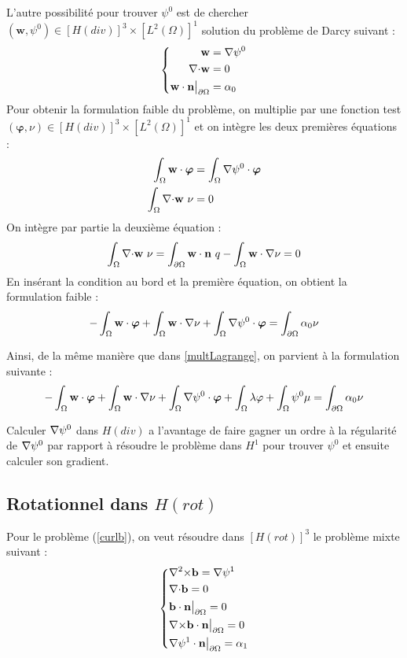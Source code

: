 L'autre possibilité pour trouver $\psi^0$ est de chercher $(\mathbf{w},\psi^0)\in [H(div)]^3\times [L^2(\Omega)]^1$ solution du problème de Darcy suivant :
\begin{equation}\label{pbpsidiv}
\left\{\begin{aligned}
\mathbf{w} &= {\nabla} \psi^0\\
{\nabla\cdot} \mathbf{w} &= 0\\
\mathbf{w}\cdot \mathbf{n}{\big\rvert_{\partial\Omega}} &= \alpha_0
\end{aligned}\right.
\end{equation}
Pour obtenir la formulation faible du problème, on multiplie par une fonction test $(\bm{\varphi},\nu)\in [H(div)]^3\times [L^2(\Omega)]^1$ et on intègre les deux premières équations :
\begin{align*}
\int_\Omega \mathbf{w}\cdot\bm{\varphi} &= \int_\Omega {\nabla}\psi^0\cdot\bm{\varphi}\\
\int_\Omega {\nabla\cdot} \mathbf{w}\ \nu &= 0
\end{align*}
On intègre par partie la deuxième équation :
\[ \int_\Omega {\nabla\cdot} \mathbf{w}\ \nu = \int_{\partial\Omega} \mathbf{w}\cdot \mathbf{n}\ q - \int_\Omega \mathbf{w}\cdot{\nabla}\nu = 0  \]
En insérant la condition au bord et la première équation, on obtient la formulation faible :
\[ -\int_\Omega \mathbf{w}\cdot\bm{\varphi} + \int_\Omega \mathbf{w}\cdot{\nabla}\nu + \int_\Omega {\nabla}\psi^0\cdot\bm{\varphi}  = \int_{\partial\Omega} \alpha_0\nu \]

 Ainsi, de la même manière que dans \ref{multLagrange}, on parvient à la formulation suivante :
\begin{equation}\label{fvpsidiv}
-\int_\Omega \mathbf{w}\cdot\bm{\varphi} + \int_\Omega \mathbf{w}\cdot{\nabla}\nu + \int_\Omega {\nabla}\psi^0\cdot\bm{\varphi} + \int_\Omega \lambda\varphi + \int_\Omega \psi^0\mu = \int_{\partial\Omega} \alpha_0\nu
\end{equation}

Calculer ${\nabla}\psi^0$ dans $H(div)$ a l'avantage de faire gagner un ordre à la régularité de ${\nabla}\psi^0$ par rapport à résoudre le problème dans $H^1$ pour trouver $\psi^0$ et ensuite calculer son gradient.\\

\subsection{Rotationnel dans $H(rot)$}

Pour le problème (\ref{curlb}), on veut résoudre dans $[H(rot)]^3$ le problème mixte suivant : 
\begin{equation}\label{pbbcurl}
\left\{\begin{aligned}
&{\nabla^2\times} \mathbf{b} = {\nabla}\psi^1\\
&{\nabla\cdot} \mathbf{b} = 0\\
&\mathbf{b}\cdot \mathbf{n}{\big\rvert_{\partial\Omega}} = 0\\
&{\nabla\times} \mathbf{b}\cdot \mathbf{n}{\big\rvert_{\partial\Omega}} = 0\\
&{\nabla}\psi^1\cdot \mathbf{n}{\big\rvert_{\partial\Omega}} = \alpha_1
\end{aligned}\right.
\end{equation}

